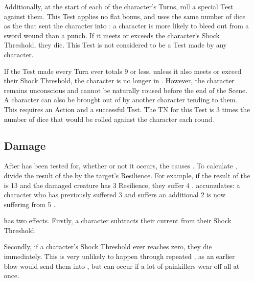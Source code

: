 Additionally, at the start of each of the  character's Turns, roll a special Test against them.
This Test applies no flat bonus, and uses the same number of dice as the  that sent the character into : a character is more likely to bleed out from a sword wound than a punch.
If it meets or exceeds the  character's Shock Threshold, they die.
This Test is not considered to be a Test made by any character.

If the Test made every Turn ever totals 9 or less, unless it also meets or exceed their Shock Threshold, the character is no longer in .
However, the character remains unconscious and cannot be naturally roused before the end of the Scene.
A character can also be brought out of  by another character tending to them.
This requires an Action and a successful  Test.
The TN for this Test is 3 times the number of dice that would be rolled against the  character each round.

\subsection{Damage}

After  has been tested for, whether or not it occurs, the  causes .
To calculate , divide the result of the  by the target's Resilience.
For example, if the result of the  is 13 and the damaged creature has 3 Resilience, they suffer 4 .
 accumulates: a character who has previously suffered 3  and suffers an additional 2 is now suffering from 5 .

 has two effects.
Firstly, a character subtracts their current  from their Shock Threshold.

Secondly, if a character's Shock Threshold ever reaches zero, they die immediately.
This is very unlikely to happen through repeated , as an earlier blow would send them into , but can occur if a lot of painkillers wear off all at once.

